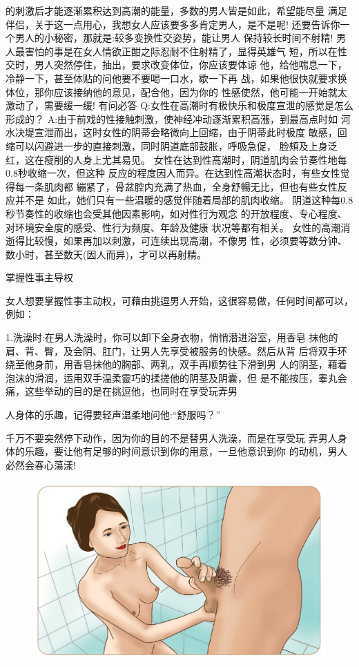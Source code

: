 \documentclass[12pt,UTF8]{ctexbook}
\begin{document}
的刺激后才能逐渐累积达到高潮的能量，多数的男人皆是如此，希望能尽量
满足伴侣，关于这一点用心，我想女人应该要多多肯定男人，是不是呢!
还要告诉你一个男人的小秘密，那就是:较多变换性交姿势，能让男人
保持较长时间不射精!
男人最害怕的事是在女人情欲正酣之际忍耐不住射精了，显得英雄气
短，所以在性交时，男人突然停住，抽出，要求改变体位，你应该要体谅
他，给他喘息一下，冷静一下，甚至体贴的问他要不要喝一口水，歇一下再
战，如果他很快就要求换体位，那你应该接纳他的意见，配合他，因为你的
性感使然，他可能一开始就太激动了，需要缓一缓!
有问必答
Q:女性在高潮时有极快乐和极度宣泄的感觉是怎么形成的？
A:由于前戏的性接触刺激，使神经冲动逐渐累积高漲，到最高点时如
河水决堤宣泄而出，这时女性的阴蒂会略微向上回缩，由于阴蒂此时极度
敏感，回缩可以闪避进一步的直接刺激，同时阴道底部鼓胀，呼吸急促，
脸頰及上身泛红，这在瘦削的人身上尤其易见。
女性在达到性高潮时，阴道肌肉会节奏性地每0.8秒收缩一次，但这种
反应的程度因人而异。在达到性高潮状态时，有些女性觉得每一条肌肉都
繃紧了，骨盆腔内充满了热血，全身舒暢无比，但也有些女性反应并不是
如此，她们只有一些温暖的感觉伴随着局部的肌肉收缩。
阴道这种每0.8秒节奏性的收缩也会受其他因素影响，如对性行为观念
的开放程度、专心程度、对环境安全度的感受、性行为频度、年龄及健康
状况等都有相关。
女性的高潮消逝得比较慢，如果再加以刺激，可连续出现高潮，不像男
性，必须要等数分钟、数小时，甚至数天(因人而异)，才可以再射精。

掌握性事主导权

女人想要掌握性事主动权，可藉由挑逗男人开始，这很容易做，任何时间都可以，例如：

1.洗澡时:在男人洗澡时，你可以卸下全身衣物，悄悄潜进浴室，用香皂
抹他的肩、背、臀，及会阴、肛门，让男人先享受被服务的快感。然后从背
后将双手环绕至他身前，用香皂抹他的胸部、两乳，双手再顺势往下滑到男
人的阴茎，藉着泡沫的滑润，运用双手温柔靈巧的揉搓他的阴茎及阴囊，但
是不能按压，睾丸会痛，这些举动的目的是在挑逗他，也同时在享受玩弄男

人身体的乐趣，记得要轻声温柔地问他:“舒服吗？”

千万不要突然停下动作，因为你的目的不是替男人洗澡，而是在享受玩
弄男人身体的乐趣，要让他有足够的时间意识到你的用意，一旦他意识到你
的动机，男人必然会春心蕩漾!

\begin{figure}[htbp]
	\centering
	\includegraphics[width=0.7\linewidth]{14}
	\caption{}
	\label{fig:1}
\end{figure}
\end{document}
